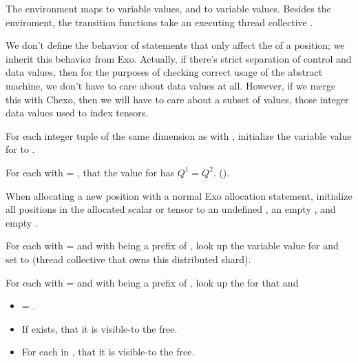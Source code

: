 The environment maps  to  variable values, and  to  variable values.
Besides the enviroment, the transition functions take an executing thread collective .

\filbreak
We don't define the behavior of statements that only affect the  of a position; we inherit this behavior from Exo.
Actually, if there's strict separation of control and data values, then for the purposes of checking correct usage of the abstract machine, we don't have to care about data values at all.
However, if we merge this with Chexo, then we will have to care about a subset of values, those integer data values used to index tensors.

\filbreak
{} For each integer tuple  of the same dimension as  with , initialize the variable value for  to .

\filbreak
{} For each  with  = ,  that the  value for  has $Q^1 = Q^2$. ().

\filbreak
{} When allocating a new position with a normal Exo allocation statement, initialize all positions in the allocated scalar or tensor to an undefined , an empty , and empty .

\filbreak
{} For each  with  =  and with  being a prefix of , look up the  variable value for  and set  to  (thread collective that owns this distributed shard).

\filbreak
{} For each  with  =  and with  being a prefix of , look up the  for that  and
\begin{itemize}
  \item {}  = .
  \filbreak
  \item If  exists,  that it is visible-to the free.
  \filbreak
  \item For each  in ,  that it is visible-to the free.
\end{itemize}

